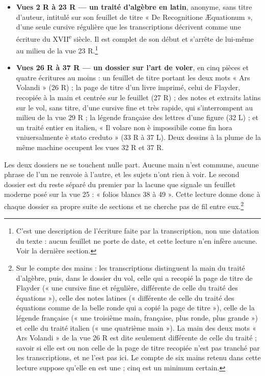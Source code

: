 \documentclass[11pt,a4paper]{article}
\begin{document}
\begin{itemize}
  \item \textbf{Vues 2 R à 23 R — un traité d'algèbre en latin}, anonyme, sans
    titre d'auteur, intitulé sur son feuillet de titre « De Recognitione
    Æquationum », d'une seule cursive régulière que les transcriptions
    décrivent comme une écriture du XVII\textsuperscript{e} siècle. Il est
    complet de son début et s'arrête de lui-même au milieu de la vue
    23 R.\footnote{C'est une description de l'écriture faite par la
    transcription, non une datation du texte : aucun feuillet ne porte de date,
    et cette lecture n'en infère aucune. Voir la dernière section.}
  \item \textbf{Vues 26 R à 37 R — un dossier sur l'art de voler}, en cinq
    pièces et quatre écritures au moins : un feuillet de titre portant les deux
    mots « Ars Volandi » (26 R) ; la page de titre d'un livre imprimé, celui de
    Flayder, recopiée à la main et centrée sur le feuillet (27 R) ; des notes et
    extraits latins sur le vol, sans titre, d'une cursive fine et très rapide,
    qui s'interrompent au milieu de la vue 29 R ; la légende française des
    lettres d'une figure (32 L) ; et un traité entier en italien, « Il volare
    non è impossibile come fin hora vniuersalmente è stato creduto » (33 R à
    37 L). Deux dessins à la plume de la même machine occupent les vues 32 R et
    37 R.
\end{itemize}

Les deux dossiers ne se touchent nulle part. Aucune main n'est commune, aucune
phrase de l'un ne renvoie à l'autre, et les sujets n'ont rien à voir. Le second
dossier est du reste séparé du premier par la lacune que signale un feuillet
moderne posé sur la vue 25 : « folios blancs 38 à 49 ». Cette lecture donne donc
à chaque dossier sa propre suite de sections et ne cherche pas de fil entre
eux.\footnote{Sur le compte des mains : les transcriptions distinguent la main
du traité d'algèbre, puis, dans le dossier du vol, celle qui a recopié la page
de titre de Flayder (« une cursive fine et régulière, différente de celle du
traité des équations »), celle des notes latines (« différente de celle du
traité des équations comme de la belle ronde qui a copié la page de titre »),
celle de la légende française (« une troisième main, française, plus ronde, plus
grande ») et celle du traité italien (« une quatrième main »). La main des deux
mots « Ars Volandi » de la vue 26 R est dite seulement différente de celle du
traité ; savoir si elle est ou non celle de la page de titre recopiée n'est pas
tranché par les transcriptions, et ne l'est pas ici. Le compte de six mains
retenu dans cette lecture suppose qu'elle en est une ; cinq est un minimum
certain.}
\end{document}
